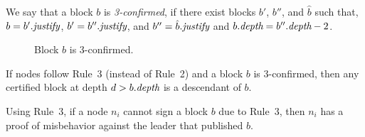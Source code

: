 \begin{definition}
\label{def:confirmed2}	
We say that a block $b$ is \emph{3-confirmed}, if there exist blocks $b'$, $b''$, and $\hat{b}$ such that, $b=b'.\textit{justify}$, $b'=b''.\textit{justify}$, and $b''=\hat{b}.\textit{justify}$ 
and $b.\textit{depth} = b''.\textit{depth}-2$.	
\end{definition}

\begin{figure}
	\centering
	
	\caption{Block $b$ is 3-confirmed.}
\end{figure}

\begin{theorem}
If nodes follow Rule~3 (instead of Rule~2) and a block $b$ is 3-confirmed, then any certified block at depth $d>b.\textit{depth}$ is a descendant of $b$.
\end{theorem}

\begin{theorem}[Speculation]
Using Rule~3, if a node $n_i$ cannot sign a block $b$ due to Rule~3, then $n_i$ has a proof of misbehavior against the leader that published $b$.
\end{theorem}